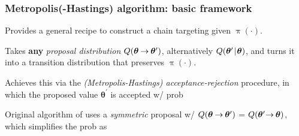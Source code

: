 \documentclass[18pt]{beamer}
\newcommand{\defineTightSpacing}{%
	\setlength{\abovedisplayskip}{.3\baselineskip}%
	\setlength{\belowdisplayskip}{.3\baselineskip}%
}
\newenvironment{tightEquation*}{%
	\defineTightSpacing%
	\begin{equation*}
}{
	\end{equation*} \ignorespacesafterend
}
\newcommand{\given}{\thinnerspace | \thinnerspace}
\newcommand{\thinnerspace}{\mskip.5\thinmuskip}
\newcommand{\tightTo}{\mskip-.4\thinmuskip \to \mskip-.4\thinmuskip}
\newcommand{\propKernel}{Q}
\newcommand{\propMarker}{\prime}
\newcommand{\acceptProb}{a}
\DeclareMathOperator{\density}{\pi}
\newcommand{\bparam}{\bm{\theta}}
\begin{document}
\renewcommand{\frametitleText}{Metropolis(-Hastings) algorithm: basic framework}
\begin{frame}
\frametitle{\frametitleText}

\vspace*{-.3\baselineskip}
Provides a general recipe to construct a chain targeting given $\density(\cdot)$.

\pause
\smallskip
Takes \textbf{any} \textit{proposal distribution} $\propKernel( \bparam \tightTo \bparam^\propMarker )$, alternatively $\propKernel( \bparam^\propMarker \given \bparam )$, 
and turns it into a transition distribution that preserves $\density(\cdot)$.

\pause
\smallskip
Achieves this via the \textit{(Metropolis-Hastings) acceptance-rejection} procedure, in which the proposed value $\bparam^\propMarker$ is accepted w/ prob

\pause
\smallskip
Original algorithm of \cite{metropolis1953} uses a \textit{symmetric} proposal w/ 
$\propKernel( \bparam \tightTo \bparam^\propMarker )$ = $\propKernel( \bparam^\propMarker \! \tightTo \bparam)$, 
which simplifies the prob as 

\end{frame}
\end{document}
